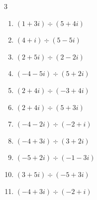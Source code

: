 \begin{multicols}{3}
\begin{enumerate}

  \item $\displaystyle (1+3i)\div(5+4i)$


  \item $\displaystyle (4+i)\div(5-5i)$


  \item $\displaystyle (2+5i)\div(2-2i)$


  \item $\displaystyle (-4-5i)\div(5+2i)$


  \item $\displaystyle (2+4i)\div(-3+4i)$


  \item $\displaystyle (2+4i)\div(5+3i)$


  \item $\displaystyle (-4-2i)\div(-2+i)$


\columnbreak %

\resetques

  \item $\displaystyle (-4+3i)\div(3+2i)$


  \item $\displaystyle (-5+2i)\div(-1-3i)$


  \item $\displaystyle (3+5i)\div(-5+3i)$

        \phantom{$\displaystyle =-i$}

  \item $\displaystyle (-4+3i)\div(-2+i)$



\end{enumerate}
\end{multicols}
